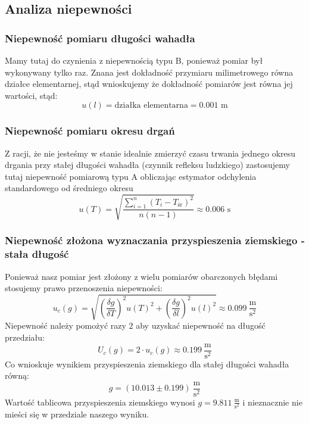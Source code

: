 \documentclass[a4paper,12pts]{article}
\begin{document}
	
	\subsection{Analiza niepewności}
	\label{analiza_niepewnosci}
	
	\subsubsection{Niepewność pomiaru długości wahadła}
	Mamy tutaj do czynienia z niepewnością typu B, ponieważ pomiar był wykonywany tylko raz. Znana jest dokładność przymiaru milimetrowego równa działce elementarnej, stąd wnioskujemy że dokładność pomiarów jest równa jej wartości, stąd:
	\begin{equation}
		u(l) = \textrm{działka elementarna} = 0.001 \textrm{ m}
	\end{equation}
	
	\subsubsection{Niepewność pomiaru okresu drgań}
	Z racji, że nie jesteśmy w stanie idealnie zmierzyć czasu trwania jednego okresu drgania przy stałej długości wahadła (czynnik refleksu ludzkiego) zastosujemy tutaj niepewność pomiarową typu A obliczając estymator odchylenia standardowego od średniego okresu
	\begin{equation}
		u(T) = \sqrt{\frac{\sum_{i=1}^{n}(T_i - T_{\textrm{śr}})^2}{n(n-1)}} \approx 0.006 \textrm{ s}
	\end{equation}
	
	\subsubsection{Niepewność złożona wyznaczania przyspieszenia ziemskiego - stała długość}
	Ponieważ nasz pomiar jest złożony z wielu pomiarów obarczonych błędami stosujemy prawo przenoszenia niepewności:
	\begin{equation}
		u_c(g) = \sqrt{\left(\frac{\delta g}{\delta T}\right)^2 u(T)^2 + \left(\frac{\delta g}{\delta l}\right)^2 u(l)^2} \approx 0.099 ~\frac{\textrm{m}}{\textrm{s}^2}
	\end{equation}
	Niepewność należy pomożyć razy $2$ aby uzyskać niepewność na długość przedziału:
	\begin{equation}
	U_c(g) = 2 \cdot u_c(g) \approx 0.199 ~\frac{\textrm{m}}{\textrm{s}^2}
	\end{equation}
	Co wnioskuje wynikiem przyspieszenia ziemskiego dla stałej długości wahadła równą:
	$$ g = (10.013 \pm 0.199) ~\frac{\textrm{m}}{\textrm{s}^2} $$
	Wartość tablicowa przyspieszenia ziemskiego wynosi $g = 9.811 ~\frac{\textrm{m}}{\textrm{s}^2}$ i nieznacznie nie mieści się w przedziale naszego wyniku.
	
\end{document}
